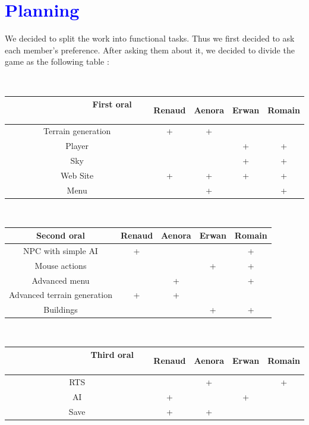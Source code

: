 \documentclass[article]{report} %
\begin{document}
				\chapter{\textcolor{blue}{Planning}}
					We decided to split the work into functional tasks. Thus we first decided to ask each member\textquoteright s preference. After asking them about it, we decided to divide the game as the following table : 
					\begin{center}
						~~~~~~~~~~~~~~\begin{tabular}{|c|c|c|c|c|}
							\hline
								~~~~~~~~~~~~~~ \textbf{First oral} ~~~~~~~~~~~~~~  & \textbf{Renaud} & \textbf{Aenora} & \textbf{Erwan} & \textbf{Romain} \\
							\hline 
						 		Terrain generation & + & + &  &  \\
							\hline
						 		Player &  &  & + & +  \\
							\hline
						 		Sky &  &  & + & +  \\
							\hline
						 		Web Site & + & + & + & +  \\
							\hline
								 Menu &  & + &  & +  \\
							\hline
						\end{tabular}
\newline

						~~~~~~~~~~~~~~\begin{tabular}{|c|c|c|c|c|}
							\hline
								\textbf{Second oral} & \textbf{Renaud} & \textbf{Aenora} & \textbf{Erwan} & \textbf{Romain} \\
							\hline
								 \ac{NPC} with simple \ac{AI} & + &  &  & + \\
							\hline
								 Mouse actions &  &  & + & + \\
							\hline
								 Advanced menu &  & + &  & + \\
							\hline
								 Advanced terrain generation & + & + &  &  \\
							\hline
				 				Buildings &  &  & + & + \\
							\hline
						\end{tabular}
\newline

						~~~~~~~~~~~~~~\begin{tabular}{|c|c|c|c|c|}
							\hline
								~~~~~~~~~~~~~~ \textbf{Third oral} ~~~~~~~~~~~~~ & \textbf{Renaud} & \textbf{Aenora} & \textbf{Erwan} & \textbf{Romain} \\
							\hline
 								\ac{RTS} &  & + &  & + \\
							\hline
 								\ac{AI} & + &  & + &  \\
							\hline
 								Save & + & + &  &  \\
							\hline
						\end{tabular}
\newline


\end{center}
\end{document}
